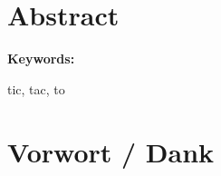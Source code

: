 \section{Abstract}
\lipsum[1-3] 

\cite{perruchoud_24fs_i4ds27_2023}

\textbf{Keywords:}

tic, tac, to


\clearpage

\section*{Vorwort / Dank}

\lipsum[2-5]

